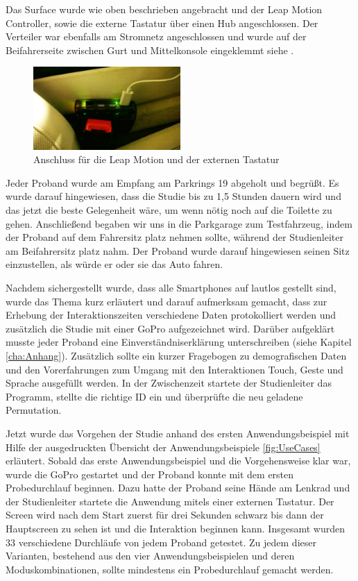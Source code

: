 Das Surface wurde wie oben beschrieben angebracht und der Leap Motion Controller, sowie die externe Tastatur über einen Hub angeschlossen. 
Der Verteiler war ebenfalls am Stromnetz angeschlossen und wurde auf der Beifahrerseite zwischen Gurt und Mittelkonsole eingeklemmt siehe . 
\begin{figure}[ht]
  \centering
  \includegraphics[width=0.5\textwidth]{img/Hub.jpg}
  \caption{Anschluss für die Leap Motion und der externen Tastatur}
  \label{fig:Hub}
\end{figure} 

Jeder Proband wurde am Empfang am Parkrings 19 abgeholt und begrüßt.
Es wurde darauf hingewiesen, dass die Studie bis zu 1,5 Stunden dauern wird und das jetzt die beste Gelegenheit wäre, um wenn nötig noch auf die Toilette zu gehen.
Anschließend begaben wir uns in die Parkgarage zum Testfahrzeug, indem der Proband auf dem Fahrersitz platz nehmen sollte, während der Studienleiter am Beifahrersitz platz nahm.
Der Proband wurde darauf hingewiesen seinen Sitz einzustellen, als würde er oder sie das Auto fahren.

Nachdem sichergestellt wurde, dass alle Smartphones auf lautlos gestellt sind, wurde das Thema kurz erläutert und darauf aufmerksam gemacht, dass zur Erhebung der Interaktionszeiten verschiedene Daten protokolliert werden und zusätzlich die Studie mit einer GoPro aufgezeichnet wird.
Darüber aufgeklärt musste jeder Proband eine Einverständniserklärung unterschreiben (siehe Kapitel \ref{cha:Anhang}).
Zusätzlich sollte ein kurzer Fragebogen zu demografischen Daten und den Vorerfahrungen zum Umgang mit den Interaktionen Touch, Geste und Sprache ausgefüllt werden.
In der Zwischenzeit startete der Studienleiter das Programm, stellte die richtige ID ein und überprüfte die neu geladene Permutation.

Jetzt wurde das Vorgehen der Studie anhand des ersten Anwendungsbeispiel mit Hilfe der ausgedruckten Übersicht der Anwendungsbeispiele \ref{fig:UseCases} erläutert.
Sobald das erste Anwendungsbeispiel und die Vorgehensweise klar war, wurde die GoPro gestartet und der Proband konnte mit dem ersten Probedurchlauf beginnen. Dazu hatte der Proband seine Hände am Lenkrad und der Studienleiter startete die Anwendung mitels einer externen Tastatur. 
Der Screen wird nach dem Start zuerst für drei Sekunden schwarz bis dann der Hauptscreen zu sehen ist und die Interaktion beginnen kann.
Insgesamt wurden 33 verschiedene Durchläufe von jedem Proband getestet.
Zu jedem dieser Varianten, bestehend aus den vier Anwendungsbeispielen und deren Moduskombinationen, sollte mindestens ein Probedurchlauf gemacht werden.

